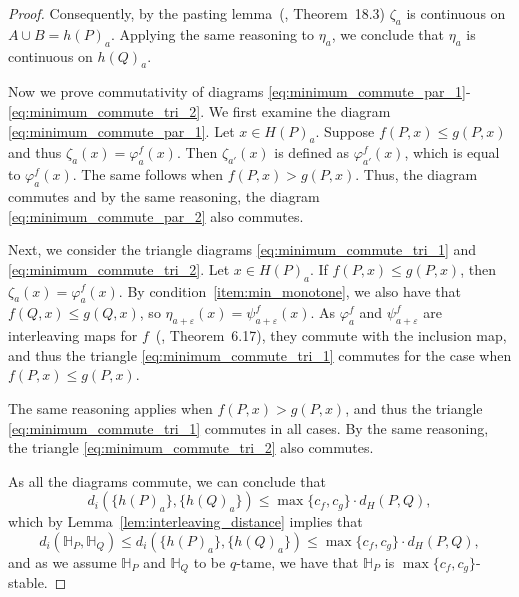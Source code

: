 \begin{proof}
    Consequently, by the pasting lemma~(\cite{munkres2000topology},
    Theorem~18.3) $\zeta_a$ is continuous on $A \cup B = h(P)_a$.
    Applying the same reasoning to $\eta_a$, we conclude that
    $\eta_a$ is continuous on $h(Q)_a$.
    
    Now we prove commutativity of diagrams
    \eqref{eq:minimum_commute_par_1}-\eqref{eq:minimum_commute_tri_2}.
    We first examine the diagram \eqref{eq:minimum_commute_par_1}.
    Let $x \in H(P)_a$. Suppose $f(P, x) \leq g(P, x)$ and thus
    $\zeta_a(x) = \varphi_a^f(x)$. Then $\zeta_{a'}(x)$ is defined as
    $\varphi_{a'}^f(x)$, which is equal to $\varphi_a^f(x)$.
    The same follows when $f(P, x) > g(P, x)$.
    Thus, the diagram commutes and by the same reasoning, the diagram
    \eqref{eq:minimum_commute_par_2} also commutes.
    
    Next, we consider the triangle diagrams \eqref{eq:minimum_commute_tri_1}
    and \eqref{eq:minimum_commute_tri_2}.
    Let $x \in H(P)_a$.
    If $f(P, x) \leq g(P, x)$, then $\zeta_a(x) = \varphi_a^f(x)$.
    By condition~\ref{item:min_monotone}, we also have that $f(Q, x) \leq g(Q, x)$,
    so $\eta_{a + \varepsilon}(x) = \psi_{a + \varepsilon}^f(x)$.
    As $\varphi_a^f$ and $\psi_{a + \varepsilon}^f$ are interleaving maps
    for $f$~(\cite{schnider2024introduction}, Theorem~6.17), they commute with
    the inclusion map, and thus the triangle \eqref{eq:minimum_commute_tri_1}
    commutes for the case when $f(P, x) \leq g(P, x)$.

    The same reasoning applies when $f(P, x) > g(P, x)$, and thus the triangle
    \eqref{eq:minimum_commute_tri_1} commutes in all cases.
    By the same reasoning, the triangle
    \eqref{eq:minimum_commute_tri_2} also commutes.
    
    As all the diagrams commute, we can conclude that 
    \begin{equation}
        d_i(\{h(P)_a\}, \{h(Q)_a\}) \leq \max\{c_f, c_g\} \cdot d_H(P, Q),
    \end{equation}
    which by Lemma~\ref{lem:interleaving_distance} implies that
    \begin{equation}
        d_i(\mathbb{H}_P, \mathbb{H}_Q) \leq d_i(\{h(P)_a\}, \{h(Q)_a\}) \leq \max\{c_f, c_g\} \cdot d_H(P, Q),
    \end{equation}
    and as we assume $\mathbb{H}_P$ and $\mathbb{H}_Q$ to be $q$-tame, we have
    that $\mathbb{H}_P$ is $\max\{c_f, c_g\}$-stable.
\end{proof}

